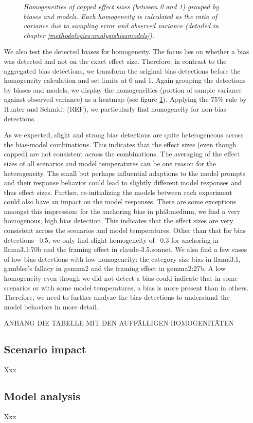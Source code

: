 \begin{figure}[htbp]
    \centering
    
    \caption[Heatmap of homogeneities grouped by biases and models]{\centering \textit{Homogeneities of capped effect sizes (between 0 and 1) grouped by biases and models. Each homogeneity is calculated as the ratio of variance due to sampling error and observed variance (detailed in chapter \ref{methodologies:analysisbiasmodels}).}}
    \label{fig:homogeneity-heatmap}
\end{figure}

\par We also test the detected biases for homogeneity. The focus lies on whether a bias was detected and not on the exact effect size. Therefore, in contrast to the aggregated bias detections, we transform the original bias detections before the homogeneity calculation and set limits at 0 and 1. Again grouping the detections by biases and models, we display the homogeneities (portion of sample variance against observed variance) as a heatmap (see figure \ref{fig:homogeneity-heatmap}). Applying the 75\% rule by Hunter and Schmidt (REF), we particularly find homogeneity for non-bias detections.

\par As we expected, slight and strong bias detections are quite heterogeneous across the bias-model combinations. This indicates that the effect sizes (even though capped) are not consistent across the combinations. The averaging of the effect sizes of all scenarios and model temperatures can be one reason for the heterogeneity. The small but perhaps influential adaptions to the model prompts and their response behavior could lead to slightly different model responses and thus effect sizes. Further, re-initializing the models between each experiment could also have an impact on the model responses. There are some exceptions amongst this impression: for the anchoring bias in phi3:medium, we find a very homogenous, high bias detection. This indicates that the effect sizes are very consistent across the scenarios and model temperatures. Other than that for bias detections \geq\, 0.5, we only find slight homogeneity of \geq\, 0.3 for anchoring in llama3.1:70b and the framing effect in claude-3.5.sonnet. We also find a few cases of low bias detections with low homogeneity: the category size bias in llama3.1, gambler's fallacy in gemma2 and the framing effect in gemma2:27b. A low homogeneity even though we did not detect a bias could indicate that in some scenarios or with some model temperatures, a bias is more present than in others. Therefore, we need to further analyze the bias detections to understand the model behaviors in more detail.

ANHANG DIE TABELLE MIT DEN AUFFÄLLIGEN HOMOGENITÄTEN

\subsection{Scenario impact}
\label{results:scenarioimpact}
Xxx

\subsection{Model analysis}
\label{results:modelanalysis}
Xxx
